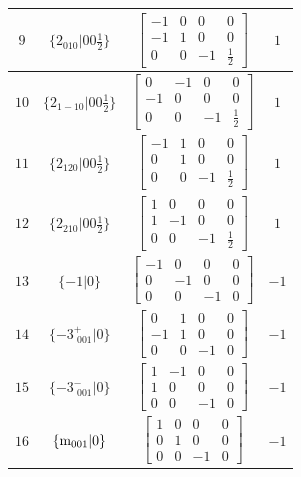 \documentclass[fleqn,8pt]{jsarticle}
\begin{document}
\begin{longtable}{cccc}
$ 9 $ & $ \{2{}_{010}|0 0 \frac{1}{2}\} $ & $ \begin{bmatrix} -1 & 0 & 0 & 0 \\ -1 & 1 & 0 & 0 \\ 0 & 0 & -1 & \frac{1}{2} \end{bmatrix} $ & $ 1 $ \\ \hline
$ 10 $ & $ \{2{}_{1-10}|0 0 \frac{1}{2}\} $ & $ \begin{bmatrix} 0 & -1 & 0 & 0 \\ -1 & 0 & 0 & 0 \\ 0 & 0 & -1 & \frac{1}{2} \end{bmatrix} $ & $ 1 $ \\ \hline
$ 11 $ & $ \{2{}_{120}|0 0 \frac{1}{2}\} $ & $ \begin{bmatrix} -1 & 1 & 0 & 0 \\ 0 & 1 & 0 & 0 \\ 0 & 0 & -1 & \frac{1}{2} \end{bmatrix} $ & $ 1 $ \\ \hline
$ 12 $ & $ \{2{}_{210}|0 0 \frac{1}{2}\} $ & $ \begin{bmatrix} 1 & 0 & 0 & 0 \\ 1 & -1 & 0 & 0 \\ 0 & 0 & -1 & \frac{1}{2} \end{bmatrix} $ & $ 1 $ \\ \hline
$ 13 $ & $ \{-1|0\} $ & $ \begin{bmatrix} -1 & 0 & 0 & 0 \\ 0 & -1 & 0 & 0 \\ 0 & 0 & -1 & 0 \end{bmatrix} $ & $ -1 $ \\ \hline
$ 14 $ & $ \{-3^{+}_{\,\,001}|0\} $ & $ \begin{bmatrix} 0 & 1 & 0 & 0 \\ -1 & 1 & 0 & 0 \\ 0 & 0 & -1 & 0 \end{bmatrix} $ & $ -1 $ \\ \hline
$ 15 $ & $ \{-3^{-}_{\,\,001}|0\} $ & $ \begin{bmatrix} 1 & -1 & 0 & 0 \\ 1 & 0 & 0 & 0 \\ 0 & 0 & -1 & 0 \end{bmatrix} $ & $ -1 $ \\ \hline
$ 16 $ & $ \{{\rm m}_{001}|0\} $ & $ \begin{bmatrix} 1 & 0 & 0 & 0 \\ 0 & 1 & 0 & 0 \\ 0 & 0 & -1 & 0 \end{bmatrix} $ & $ -1 $ \\ \hline

\end{longtable}
\end{document}
